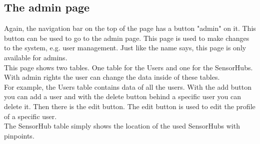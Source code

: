 \documentclass[a4paper]{article}
\begin{document}
\subsection{The admin page}
Again, the navigation bar on the top of the page has a button "admin" on it. This button can be used to go to the admin page. This page is used to make changes to the system, e.g. user management. Just like the name says, this page is only available for admins.
\\
This page shows two tables. One table for the Users and one for the SensorHubs. With admin rights the user can change the data inside of these tables.
\\
For example, the Users table contains data of all the users. With the add button you can add a user and with the delete button behind a specific user you can delete it. Then there is the edit button. The edit button is used to edit the profile of a specific user.
\\
The SensorHub table simply shows the location of the used SensorHubs with pinpoints.
\end{document}
